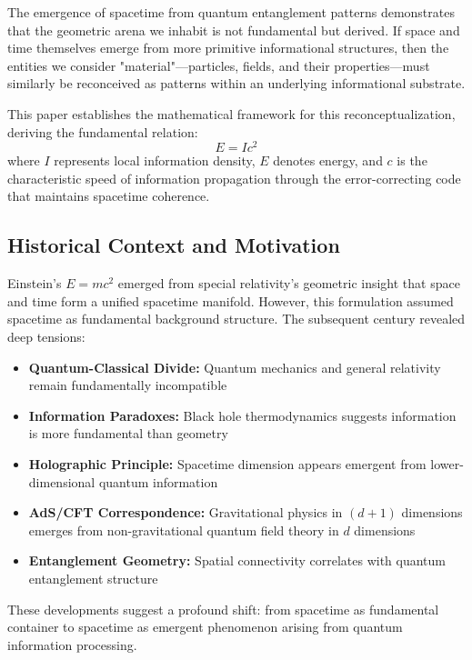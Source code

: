 \documentclass[12pt,a4paper]{article}
\theoremstyle{remark}
\begin{document}
The emergence of spacetime from quantum entanglement patterns demonstrates that the geometric arena we inhabit is not fundamental but derived. If space and time themselves emerge from more primitive informational structures, then the entities we consider "material"—particles, fields, and their properties—must similarly be reconceived as patterns within an underlying informational substrate.

This paper establishes the mathematical framework for this reconceptualization, deriving the fundamental relation:
\begin{equation}
\boxed{E = Ic^2}
\label{eq:fundamental}
\end{equation}
where $I$ represents local information density, $E$ denotes energy, and $c$ is the characteristic speed of information propagation through the error-correcting code that maintains spacetime coherence.

\subsection{Historical Context and Motivation}

Einstein's $E = mc^2$ emerged from special relativity's geometric insight that space and time form a unified spacetime manifold. However, this formulation assumed spacetime as fundamental background structure. The subsequent century revealed deep tensions:

\begin{itemize}[leftmargin=*]
\item \textbf{Quantum-Classical Divide:} Quantum mechanics and general relativity remain fundamentally incompatible
\item \textbf{Information Paradoxes:} Black hole thermodynamics suggests information is more fundamental than geometry \cite{Bekenstein1973, Hawking1975}
\item \textbf{Holographic Principle:} Spacetime dimension appears emergent from lower-dimensional quantum information \cite{tHooft1993, Susskind1995}
\item \textbf{AdS/CFT Correspondence:} Gravitational physics in $(d+1)$ dimensions emerges from non-gravitational quantum field theory in $d$ dimensions \cite{Maldacena1998}
\item \textbf{Entanglement Geometry:} Spatial connectivity correlates with quantum entanglement structure \cite{Ryu2006, VanRaamsdonk2010}
\end{itemize}

These developments suggest a profound shift: from spacetime as fundamental container to spacetime as emergent phenomenon arising from quantum information processing.
\end{document}
